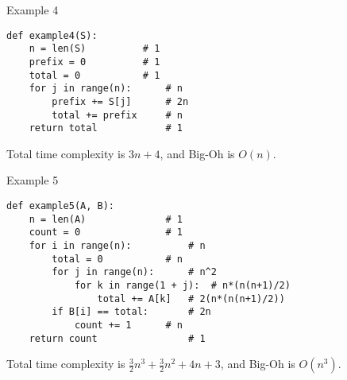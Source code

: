 \documentclass[10pt]{article}
\begin{document}
\begin{singlespace}
\noindent Example 4

\begin{lstlisting}
def example4(S):
	n = len(S)			# 1
	prefix = 0			# 1
	total = 0			# 1
	for j in range(n):		# n
		prefix += S[j]		# 2n
		total += prefix		# n
	return total			# 1
\end{lstlisting}
Total time complexity is $3n+4$, and Big-Oh is $O(n)$.


\noindent Example 5

\begin{lstlisting}
def example5(A, B):
	n = len(A)				# 1
	count = 0				# 1
	for i in range(n):			# n
		total = 0			# n
		for j in range(n):		# n^2
			for k in range(1 + j):	# n*(n(n+1)/2)
				total += A[k]	# 2(n*(n(n+1)/2))
		if B[i] == total:		# 2n
			count += 1		# n
	return count				# 1
\end{lstlisting}
Total time complexity is $\displaystyle \frac{3}{2}n^3+\frac{3}{2}n^2+4n+3$, and Big-Oh is $O(n^3)$.


\end{singlespace}
\end{document}
